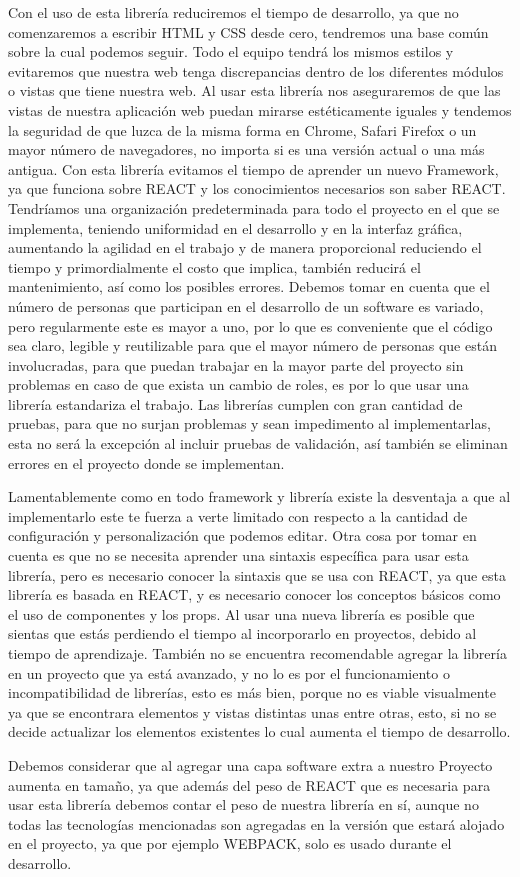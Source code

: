 Con el uso de esta librería reduciremos el tiempo de desarrollo, ya que no comenzaremos a escribir HTML y CSS desde cero, tendremos una base común sobre la cual podemos seguir. Todo el equipo tendrá los mismos estilos y evitaremos que nuestra web tenga discrepancias dentro de los diferentes módulos o vistas que tiene nuestra web. 
Al usar esta librería nos aseguraremos de que las vistas de nuestra aplicación web puedan mirarse estéticamente iguales y tendemos la seguridad de que luzca de la misma forma en Chrome, Safari Firefox o un mayor número de navegadores, no importa si es una versión actual o una más antigua. 
Con esta librería evitamos el tiempo de aprender un nuevo Framework, ya que funciona sobre REACT y los conocimientos necesarios son saber REACT. 
Tendríamos una organización predeterminada para todo el proyecto en el que se implementa, teniendo uniformidad en el desarrollo y en la interfaz gráfica, aumentando la agilidad en el trabajo y de manera proporcional reduciendo el tiempo y primordialmente el costo que implica, también reducirá el mantenimiento, así como los posibles errores. 
Debemos tomar en cuenta que el número de personas que participan en el desarrollo de un software es variado, pero regularmente este es mayor a uno, por lo que es conveniente que el código sea claro, legible y reutilizable para que el mayor número de personas que están involucradas, para que puedan trabajar en la mayor parte del proyecto sin problemas en caso de que exista un cambio de roles, es por lo que usar una librería estandariza el trabajo. 
Las librerías cumplen con gran cantidad de pruebas, para que no surjan problemas y sean impedimento al implementarlas, esta no será la excepción al incluir pruebas de validación, así también se eliminan errores en el proyecto donde se implementan. 
  
Lamentablemente como en todo framework y librería existe la desventaja a que al implementarlo este te fuerza a verte limitado con respecto a la cantidad de configuración y personalización que podemos editar. Otra cosa por tomar en cuenta es que no se necesita aprender una sintaxis específica para usar esta librería, pero es necesario conocer la sintaxis que se usa con REACT, ya que esta librería es basada en REACT, y es necesario conocer los conceptos básicos como el uso de componentes y los props. Al usar una nueva librería es posible que sientas que estás perdiendo el tiempo al incorporarlo en proyectos, debido al tiempo de aprendizaje. También no se encuentra recomendable agregar la librería en un proyecto que ya está avanzado, y no lo es por el funcionamiento o incompatibilidad de librerías, esto es más bien, porque no es viable visualmente ya que se encontrara elementos y vistas distintas unas entre otras, esto, si no se decide actualizar los elementos existentes lo cual aumenta el tiempo de desarrollo.


Debemos considerar que al agregar una capa software extra a nuestro Proyecto aumenta en tamaño, ya que además del peso de REACT que es necesaria para usar esta librería debemos contar el peso de nuestra librería en sí, aunque no todas  las tecnologías  mencionadas son agregadas en la versión que estará alojado en el proyecto, ya que por ejemplo WEBPACK, solo es usado durante el desarrollo.
\newpage
